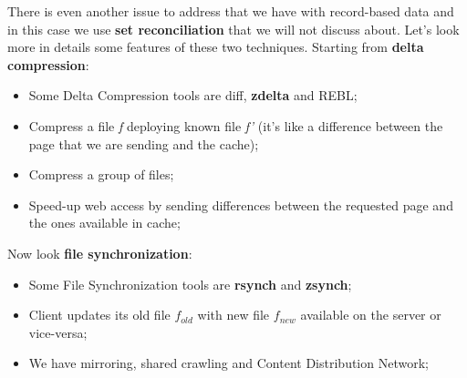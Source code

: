 There is even another issue to address that we have with record-based data and in this case we use \textbf{set reconciliation} that we will not discuss about.\newline
Let's look more in details some features of these two techniques.\newline
Starting from \textbf{delta compression}:
\begin{itemize}
    \item Some Delta Compression tools are diff, \textbf{zdelta} and REBL;
    \item Compress a file \textit{f} deploying known file \textit{f'} (it's like a difference between the page that we are sending and the cache);
    \item Compress a group of files;
    \item Speed-up web access by sending differences between the requested page and the ones available in cache;
\end{itemize}
Now look \textbf{file synchronization}:
\begin{itemize}
    \item Some File Synchronization tools are \textbf{rsynch} and \textbf{zsynch};
    \item Client updates its old file $f_{old}$ with new file $f_{new}$ available on the server or vice-versa;
    \item We have mirroring, shared crawling and Content Distribution Network;
\end{itemize}
